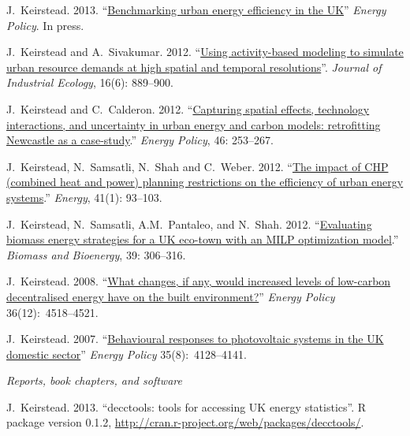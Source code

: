 \documentclass[11pt,a4paper]{article}
\begin{document}
\ind J.\ Keirstead. 2013. ``\href{http://dx.doi.org/10.1016/j.enpol.2013.08.063}{Benchmarking urban energy efficiency in the UK}'' \emph{Energy Policy}.  In press.

\ind J.\ Keirstead and A.\ Sivakumar. 2012. ``\href{http://dx.doi.org/10.1111/j.1530-9290.2012.00486.x}{Using activity-based modeling to simulate urban resource demands at high spatial and temporal resolutions}''. \emph{Journal of Industrial Ecology}, 16(6): 889--900.

\ind J.\ Keirstead and C.\ Calderon.  2012. ``\href{http://dx.doi.org/10.1016/j.enpol.2012.03.058}{Capturing spatial effects, technology interactions, and uncertainty in urban energy and carbon models: retrofitting Newcastle as a case-study}.''  \emph{Energy Policy}, 46: 253--267.


\ind J.\ Keirstead, N.\ Samsatli, N.\ Shah and C.\ Weber. 2012. ``\href{http://dx.doi.org/10.1016/j.energy.2011.06.011}{The impact of CHP (combined heat and power) planning restrictions on the efficiency of urban energy systems}.'' \emph{Energy}, 41(1): 93--103. 

\ind J.\ Keirstead, N.\ Samsatli, A.M.\ Pantaleo, and N.\ Shah. 2012. ``\href{http://dx.doi.org/10.1016/j.biombioe.2012.01.022}{Evaluating biomass energy strategies for a UK eco-town with an MILP optimization model}.'' \emph{Biomass and Bioenergy}, 39: 306--316.

\ind J.\ Keirstead. 2008. ``\href{http://dx.doi.org/10.1016/j.enpol.2008.09.019}{What changes, if any, would increased levels of low-carbon decentralised energy have on the built environment?}'' \emph{Energy Policy} 36(12):~4518--4521.

\ind J.\ Keirstead. 2007. ``\href{http://dx.doi.org/10.1016/j.enpol.2007.02.019}{Behavioural responses to photovoltaic systems in the UK domestic sector}'' \emph{Energy Policy} 35(8):~4128--4141.

\bigskip

\noindent\emph{Reports, book chapters, and software\vspace{0.01in}}

\ind J.\ Keirstead. 2013. ``decctools: tools for accessing UK energy statistics''. R package version 0.1.2, \url{http://cran.r-project.org/web/packages/decctools/}.
\end{document}
